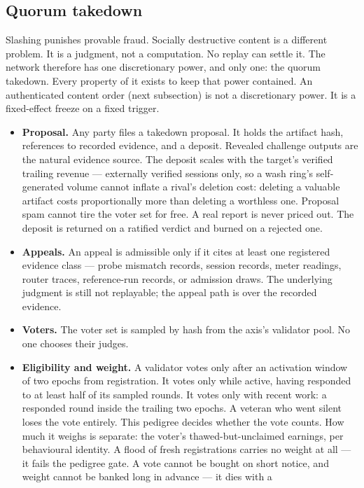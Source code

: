 \documentclass[11pt]{article}
\begin{document}
\subsection{Quorum takedown}

Slashing punishes provable fraud. Socially destructive content is
a different problem. It is a judgment, not a computation. No
replay can settle it. The network therefore has one discretionary
power, and only one: the quorum takedown. Every property of it
exists to keep that power contained. An authenticated content
order (next subsection) is not a discretionary power. It is a
fixed-effect freeze on a fixed trigger.

\begin{itemize}
\item \textbf{Proposal.} Any party files a takedown proposal. It
holds the artifact hash, references to recorded evidence, and a
deposit. Revealed challenge outputs are the natural evidence
source. The deposit scales with the target's verified trailing revenue ---
externally verified sessions only, so a wash ring's
self-generated volume cannot inflate a rival's deletion cost:
deleting a valuable artifact costs proportionally more
than deleting a worthless one. Proposal spam cannot tire the
voter set for free. A real report is never priced out. The
deposit is returned on a ratified verdict and burned on a
rejected one.
\item \textbf{Appeals.} An appeal is admissible only if it
cites at least one registered evidence class --- probe mismatch
records, session records, meter readings, router traces,
reference-run records, or admission draws. The underlying
judgment is still not replayable; the appeal path is over the
recorded evidence.
\item \textbf{Voters.} The voter set is sampled by hash from the
axis's validator pool. No one chooses their judges.
\item \textbf{Eligibility and weight.} A validator votes only
after an activation window of two epochs from registration. It
votes only while active, having responded to at least half of its
sampled rounds. It votes only with recent work: a responded
round inside the trailing two epochs. A veteran who went silent
loses the vote entirely. This pedigree decides whether the vote
counts. How much it weighs is separate: the voter's
thawed-but-unclaimed earnings, per behavioural identity. A flood
of fresh registrations carries no weight at all --- it fails the
pedigree gate. A vote cannot be bought on short notice, and
weight cannot be banked long in advance --- it dies with a

\end{itemize}
\end{document}
